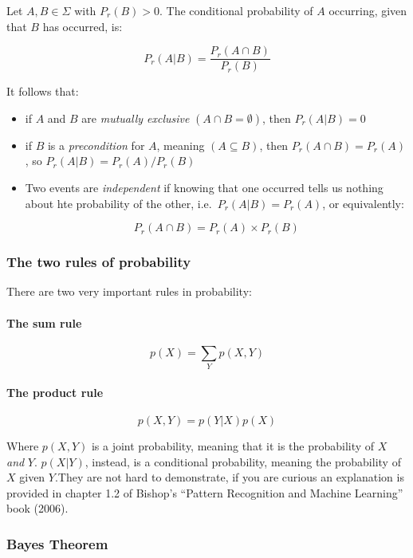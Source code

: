 \documentclass{article}
\begin{document}
Let \(A, B \in \Sigma\) with \(P_r(B) > 0\). The conditional probability
of \(A\) occurring, given that \(B\) has occurred, is:

\[P_r(A|B) = \frac{P_r(A \cap B)}{P_r(B)}\]

It follows that:

\begin{itemize}
\item
  if \(A\) and \(B\) are \emph{mutually exclusive}
  \((A \cap B = \emptyset)\), then \(P_r(A|B) = 0\)
\item
  if \(B\) is a \emph{precondition} for \(A\), meaning
  \((A \subseteq B)\), then \(P_r(A
  \cap B) = P_r(A)\), so \(P_r(A|B) = P_r(A) / P_r(B)\)
\item
  Two events are \emph{independent} if knowing that one occurred tells
  us nothing about hte probability of the other,
  i.e.~\(P_r(A|B) = P_r(A)\), or equivalently:

  \[P_r(A \cap B) = P_r(A) \times P_r(B)\]
\end{itemize}

\subsubsection{The two rules of
probability}\label{the-two-rules-of-probability}

There are two very important rules in probability:

\paragraph{The sum rule}\label{the-sum-rule}

\[p(X) = \sum_Y p(X, Y)\]

\paragraph{The product rule}\label{the-product-rule}

\[p(X,Y) = p(Y|X)p(X)\]

Where \(p(X, Y)\) is a joint probability, meaning that it is the
probability of \(X\) \emph{and} \(Y\). \(p(X|Y)\), instead, is a
conditional probability, meaning the probability of \(X\) given
\(Y\).They are not hard to demonstrate, if you are curious an
explanation is provided in chapter 1.2 of Bishop's ``Pattern Recognition
and Machine Learning'' book (2006).

\subsubsection{Bayes Theorem}\label{bayes-theorem}
\end{document}
